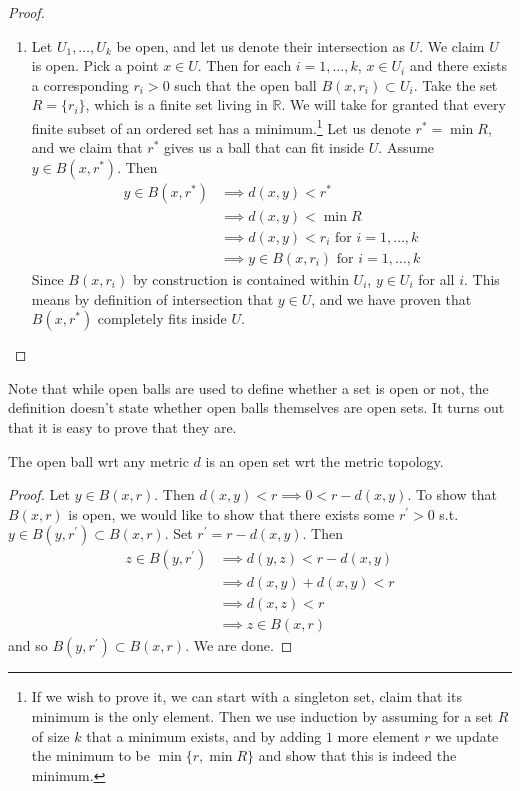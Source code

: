 \begin{proof}
\begin{enumerate}
      \item Let $U_1, \ldots, U_k$ be open, and let us denote their intersection as $U$. We claim $U$ is open. Pick a point $x \in U$. Then for each $i = 1, \ldots, k$, $x \in U_i$ and there exists a corresponding $r_i > 0$  such that the open ball $B(x, r_i) \subset U_i$. Take the set $R = \{r_i\}$, which is a finite set living in $\mathbb{R}$. We will take for granted that every finite subset of an ordered set has a minimum.\footnote{If we wish to prove it, we can start with a singleton set, claim that its minimum is the only element. Then we use induction by assuming for a set $R$ of size $k$ that a minimum exists, and by adding $1$ more element $r$ we update the minimum to be $\min\{r, \min{R}\}$ and show that this is indeed the minimum.} Let us denote $r^\ast = \min{R}$, and we claim that $r^\ast$ gives us a ball that can fit inside $U$. Assume $y \in B(x, r^\ast)$. Then 
      \begin{align}
        y \in B(x, r^\ast) & \implies d(x, y) < r^\ast \\ 
                           & \implies d(x, y) < \min{R} \\
                           & \implies d(x, y) < r_i \text{ for } i = 1, \ldots, k \\
                           & \implies y \in B(x, r_i) \text{ for } i = 1, \ldots, k
      \end{align} 
      Since $B(x, r_i)$ by construction is contained within $U_i$, $y \in U_i$ for all $i$. This means by definition of intersection that $y \in U$, and we have proven that $B(x, r^\ast)$ completely fits inside $U$. 
    \end{enumerate}
  \end{proof} 

  Note that while open balls are used to define whether a set is open or not, the definition doesn't state whether open balls themselves are open sets. It turns out that it is easy to prove that they are. 
  
  \begin{lemma}
    The open ball wrt any metric $d$ is an open set wrt the metric topology. 
  \end{lemma}
  \begin{proof}
    Let $y \in B(x, r)$. Then $d(x, y) < r \implies 0 < r - d(x, y)$. To show that $B(x, r)$ is open, we would like to show that there exists some $r^\prime > 0$ s.t. $y \in B(y, r^\prime) \subset B(x, r)$. Set $r^\prime = r - d(x, y)$. Then 
    \begin{align}
      z \in B(y, r^\prime) & \implies d(y, z) < r - d(x, y) \\
                           & \implies d(x, y) + d(x, y) < r \\
                           & \implies d(x, z) < r \\
                           & \implies z \in B(x, r)
    \end{align} 
    and so $B(y, r^\prime) \subset B(x, r)$. We are done. 
  \end{proof}

